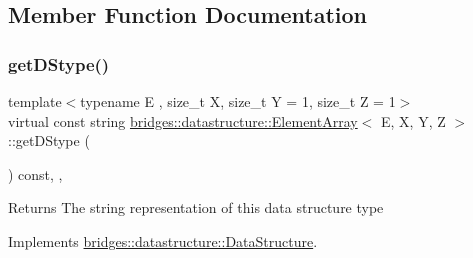 \subsection{Member Function Documentation}
\mbox{\label{classbridges_1_1datastructure_1_1_element_array_a22d8c37e88616105cdb7c755f99fdb20}} 
\subsubsection{\texorpdfstring{get\+D\+Stype()}{getDStype()}}
{\footnotesize\ttfamily template$<$typename E , size\+\_\+t X, size\+\_\+t Y = 1, size\+\_\+t Z = 1$>$ \\
virtual const string \mbox{\hyperlink{classbridges_1_1datastructure_1_1_element_array}{bridges\+::datastructure\+::\+Element\+Array}}$<$ E, X, Y, Z $>$\+::get\+D\+Stype (\begin{DoxyParamCaption}{ }\end{DoxyParamCaption}) const\hspace{0.3cm}{\ttfamily [inline]}, {\ttfamily [override]}, {\ttfamily [virtual]}}

\begin{DoxyReturn}{Returns}
The string representation of this data structure type 
\end{DoxyReturn}


Implements \mbox{\hyperlink{classbridges_1_1datastructure_1_1_data_structure_a4ff66cb34409f11fe9fc647f6d8a22ce}{bridges\+::datastructure\+::\+Data\+Structure}}.

\mbox{\label{classbridges_1_1datastructure_1_1_element_array_a383d08e16eeeb06217d030ed2b18fb37}} 
